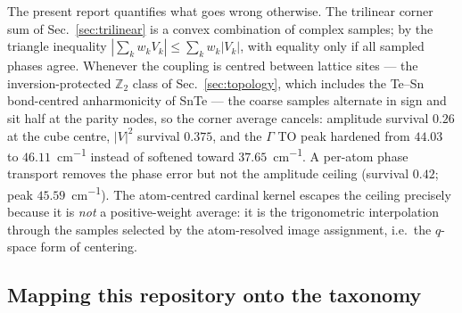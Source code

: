 \documentclass[11pt,a4paper]{article}
\begin{document}
The present report quantifies what goes wrong otherwise.  The trilinear
corner sum of Sec.~\ref{sec:trilinear} is a convex combination of complex
samples; by the triangle inequality
$|\sum_k w_k V_k|\le\sum_k w_k|V_k|$, with equality only if all sampled
phases agree.  Whenever the coupling is centred between lattice sites
--- the inversion-protected $\mathbb Z_2$ class of
Sec.~\ref{sec:topology}, which includes the Te--Sn bond-centred
anharmonicity of SnTe --- the coarse samples alternate in sign and sit
half at the parity nodes, so the corner average cancels: amplitude
survival $0.26$ at the cube centre, $|V|^2$ survival $0.375$, and the
$\Gamma$ TO peak hardened from $44.03$ to $46.11$~\si{cm^{-1}} instead of
softened toward $37.65$~\si{cm^{-1}}.  A per-atom phase transport removes
the phase error but not the amplitude ceiling (survival $0.42$; peak
$45.59$~\si{cm^{-1}}).  The atom-centred cardinal kernel escapes the
ceiling precisely because it is \emph{not} a positive-weight average: it
is the trigonometric interpolation through the samples selected by the
atom-resolved image assignment, i.e.\ the $q$-space form of centering.

\subsection{Mapping this repository onto the taxonomy}
\label{sec:codes-mapping}
\end{document}
